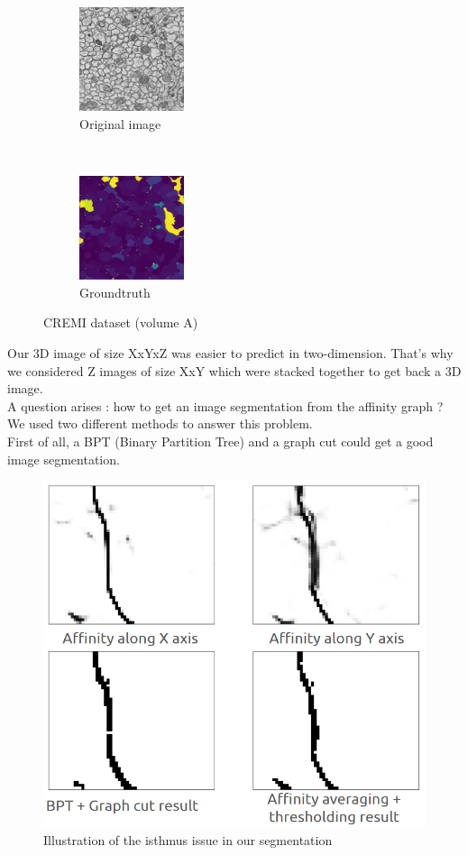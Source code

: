\begin{figure}[!htbp]
    \centering
    \begin{subfigure}[t]{0.45\textwidth}
        \centering
        \includegraphics[height=1.2in]{./images/cremi_orig_1.png}
        \caption{Original image}
    \end{subfigure}%
    ~ 
    \begin{subfigure}[t]{0.45\textwidth}
        \centering
        \includegraphics[height=1.2in]{./images/cremi_gt_1.png}
        \caption{Groundtruth}
    \end{subfigure}
    \caption{CREMI dataset (volume A)}
\end{figure}

Our 3D image of size XxYxZ was easier to predict in two-dimension. 
That's why we considered Z images of size XxY which were stacked together to get back a 3D image.\\


A question arises : how to get an image segmentation from the affinity graph ?\\

We used two different methods to answer this problem.\\
First of all, a BPT (Binary Partition Tree) and a graph cut could get a good image segmentation. 

\begin{figure}[!htbp]
	\centering
	\includegraphics[width=0.8\linewidth]{./images/cremi_isthmus.png}
	\caption{Illustration of the isthmus issue in our segmentation}%
	\label{fig:cremi_isthmus}
\end{figure}

